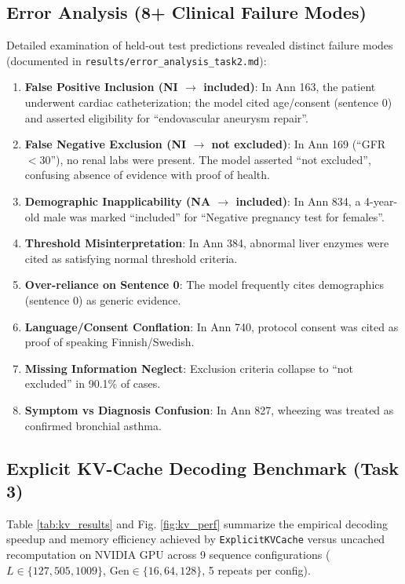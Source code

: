 \documentclass[conference]{IEEEtran}
\begin{document}
\subsection{Error Analysis (8+ Clinical Failure Modes)}
Detailed examination of held-out test predictions revealed distinct failure modes (documented in \texttt{results/error\_analysis\_task2.md}):
\begin{enumerate}
    \item \textbf{False Positive Inclusion (NI $\to$ included)}: In Ann 163, the patient underwent cardiac catheterization; the model cited age/consent (sentence 0) and asserted eligibility for ``endovascular aneurysm repair''.
    \item \textbf{False Negative Exclusion (NI $\to$ not excluded)}: In Ann 169 (``GFR $<30$''), no renal labs were present. The model asserted ``not excluded'', confusing absence of evidence with proof of health.
    \item \textbf{Demographic Inapplicability (NA $\to$ included)}: In Ann 834, a 4-year-old male was marked ``included'' for ``Negative pregnancy test for females''.
    \item \textbf{Threshold Misinterpretation}: In Ann 384, abnormal liver enzymes were cited as satisfying normal threshold criteria.
    \item \textbf{Over-reliance on Sentence 0}: The model frequently cites demographics (sentence 0) as generic evidence.
    \item \textbf{Language/Consent Conflation}: In Ann 740, protocol consent was cited as proof of speaking Finnish/Swedish.
    \item \textbf{Missing Information Neglect}: Exclusion criteria collapse to ``not excluded'' in 90.1\% of cases.
    \item \textbf{Symptom vs Diagnosis Confusion}: In Ann 827, wheezing was treated as confirmed bronchial asthma.
\end{enumerate}

\subsection{Explicit KV-Cache Decoding Benchmark (Task 3)}
Table \ref{tab:kv_results} and Fig. \ref{fig:kv_perf} summarize the empirical decoding speedup and memory efficiency achieved by \texttt{ExplicitKVCache} versus uncached recomputation on NVIDIA GPU across 9 sequence configurations ($L \in \{127, 505, 1009\}$, $\text{Gen} \in \{16, 64, 128\}$, 5 repeats per config).
\end{document}
